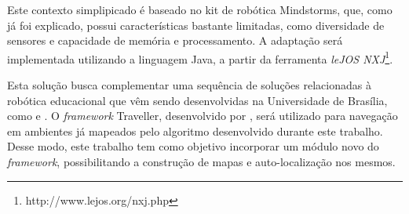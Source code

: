 Este contexto simplipicado é baseado no kit de robótica Mindstorms, que, como já foi explicado, possui características bastante limitadas, como diversidade de sensores e capacidade de memória e processamento. A adaptação será implementada utilizando a linguagem Java, a partir da ferramenta \textit{leJOS NXJ}\footnote{http://www.lejos.org/nxj.php}.

Esta solução busca complementar uma sequência de soluções relacionadas à robótica educacional que vêm sendo desenvolvidas na Universidade de Brasília, como \cite{tccCarol} e \cite{tccRodrigo}. O \textit{framework} Traveller, desenvolvido por \cite{tccRodrigo}, será utilizado para navegação em ambientes já mapeados pelo algoritmo desenvolvido durante este trabalho. Desse modo, este trabalho tem como objetivo incorporar um módulo novo do \textit{framework}, possibilitando a construção de mapas e auto-localização nos mesmos.


